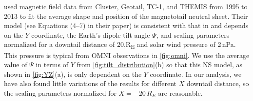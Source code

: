 \documentclass[draft]{agujournal2019}
\begin{document}
 used magnetic field data from Cluster, Geotail, TC-1, and THEMIS from 1995 to 2013 to fit the average shape and position of the magnetotail neutral sheet. Their model (see Equations (4--7) in their paper) is consistent with that in  and depends on the $Y$ coordinate, the Earth's dipole tilt angle $\Psi$, and scaling parameters normalized for a downtail distance of 20,\si{R_E} and solar wind pressure of 2\,\si{nPa}. This pressure is typical from OMNI observations in \cref{fig:omni}. We use the average value of $\Psi$ in terms of $Y$ from \cref{fig:tilt_distribution}(b) so that this NS model, as shown in \cref{fig:YZ}(a), is only dependent on the $Y$ coordinate. In our analysis, we have also found little variations of the results for different $X$ downtail distance, so the scaling parameters normalized for $X=-20\,\si{R_E}$ are reasonable.


\end{document}
